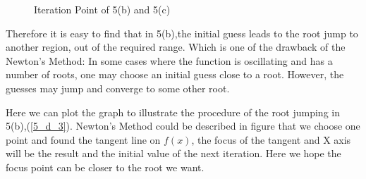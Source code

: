 \begin{solution}
\begin{enumerate}[label=(\alph*)]
\begin{figure}[htb]
\centering
{}
\quad
{}
\caption{Iteration Point of 5(b) and 5(c)}
\label{Q5_d_1}
\end{figure}



Therefore it is easy to find that in 5(b),the initial guess leads to the root jump to another region, out of the required range. Which is one of the drawback of the Newton's Method: In some cases where the function is oscillating and has a number of roots, one may choose an initial guess close to a root. However, the guesses may jump and converge to some other root.


Here we can plot the graph to illustrate the procedure of the root jumping in 5(b),(\ref{5_d_3}). Newton's Method could be described in figure that we choose one point and found the tangent line on $f(x)$, the focus of the tangent and X axis will be the result and the initial value of the next iteration. Here we hope the focus point can be closer to the root we want. 




\end{enumerate}
\end{solution}
